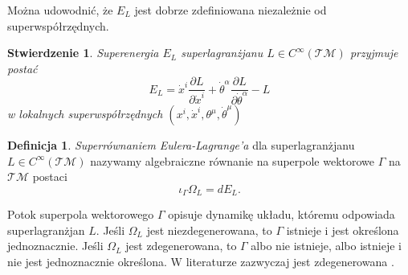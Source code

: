 \documentclass[11pt,a4paper]{report}
\newtheorem{proposition}[theorem]{Stwierdzenie}
\theoremstyle{definition}
\newtheorem{definition}[theorem]{Definicja}
\begin{document}
Można udowodnić, że $E_L$ jest dobrze zdefiniowana niezależnie od superwspółrzędnych.
			      				
\begin{proposition}\label{PostacSuperEnergia} Superenergia $E_L$ superlagranżjanu $L\in C^\infty(\mathcal{TM})$   przyjmuje postać
	\begin{equation*}
		E_L = \dot x^i\frac{\partial L}{\partial \dot x^i}+\dot\theta^\alpha\frac{\partial L}{\partial \dot \theta^\alpha}-L
	\end{equation*}
	w lokalnych superwspółrzędnych $(x^i, \dot x^i, \theta^\mu, \dot \theta^\mu )$
\end{proposition}
			      				
			      				
\begin{definition}
	\textit{Superrównaniem Eulera-Lagrange'a} dla superlagranżjanu $L\in C^\infty(\mathcal{TM})$ nazywamy algebraiczne równanie na superpole wektorowe $\Gamma$ na $\mathcal{TM}$ postaci
	\begin{equation}
		\label{eq:sele}
		\iota_\Gamma \Omega_L = dE_L.
	\end{equation}
\end{definition}
			      				
Potok superpola wektorowego $\Gamma$ opisuje dynamikę układu, któremu odpowiada superlagranżjan $L$. Jeśli $\Omega_L$ jest niezdegenerowana, to $\Gamma$ istnieje i jest określona jednoznacznie. Jeśli $\Omega_L$ jest zdegenerowana, to $\Gamma$ albo nie istnieje, albo istnieje i nie jest jednoznacznie określona. W literaturze zazwyczaj jest zdegenerowana \cite{So99}.
			      				
\end{document}
